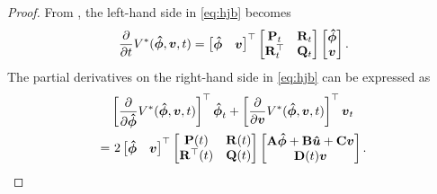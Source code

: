 \documentclass[journal,twoside,web]{ieeecolor}
\newcommand{\state}{\phi}
\newcommand{\statehat}{\hat{\state}}
\begin{document}
\begin{proof}
From , the left-hand side in \eqref{eq:hjb} becomes
\begin{equation}\label{eq:hjb-lhs}
	\pdv{}{t}V^*(\boldsymbol{\statehat},\boldsymbol{v},t)=
	\begin{bmatrix}
		\boldsymbol{\statehat} & \boldsymbol{v}
	\end{bmatrix}^\top
	\begin{bmatrix}
		\mathbf{P}_t & \mathbf{R}_t \\ \mathbf{R}^\top_t & \mathbf{Q}_t
	\end{bmatrix}
	\begin{bmatrix}
		\boldsymbol{\statehat} \\ \boldsymbol{v}
	\end{bmatrix}.
\end{equation}
The partial derivatives on the right-hand side in \eqref{eq:hjb} can be expressed as
\begin{align*}
	&\left[\pdv{}{\boldsymbol{\statehat}}V^*(\boldsymbol{\statehat},\boldsymbol{v},t)\right]^\top \boldsymbol{\statehat}_t + \left[\pdv{}{\boldsymbol{v}}V^*(\boldsymbol{\statehat},\boldsymbol{v},t)\right]^\top \boldsymbol{v}_t \\
	 =&\ 
	 2\begin{bmatrix}
		\boldsymbol{\statehat} & \boldsymbol{v}
	\end{bmatrix}^\top
	\begin{bmatrix}
		\mathbf{P}(t) & \mathbf{R}(t) \\ \mathbf{R}^\top(t) & \mathbf{Q}(t)
	\end{bmatrix}
	\begin{bmatrix}
		\mathbf{A}\boldsymbol{\statehat}+\mathbf{B}\boldsymbol{\hat{u}}+\mathbf{C}\boldsymbol{v} \\ \mathbf{D}(t)\boldsymbol{v}
	\end{bmatrix}.
\end{align*}

\end{proof}
\end{document}
